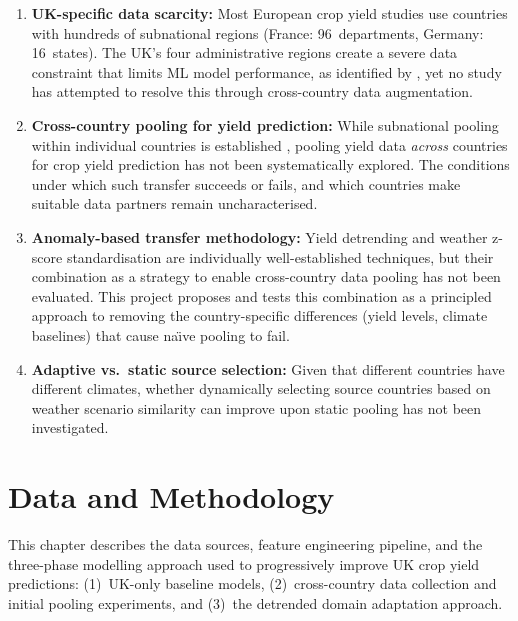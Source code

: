 \documentclass[12pt,a4paper]{report}
\begin{document}
\begin{enumerate}                                                                                                                                                  
      \item \textbf{UK-specific data scarcity:} Most European crop yield studies use countries with hundreds of subnational regions (France: 96~departments, Germany:
   16~states). The UK's four administrative regions create a severe data constraint that limits ML model performance, as identified by \citet{corcoran2023}, yet no  
  study has attempted to resolve this through cross-country data augmentation.                                                                                       
      \item \textbf{Cross-country pooling for yield prediction:} While subnational pooling within individual countries is established \citep{paudel2021}, pooling    
  yield data \emph{across} countries for crop yield prediction has not been systematically explored. The conditions under which such transfer succeeds or fails, and
   which countries make suitable data partners remain uncharacterised.
      \item \textbf{Anomaly-based transfer methodology:} Yield detrending and weather z-score standardisation are individually well-established techniques, but their
   combination as a strategy to enable cross-country data pooling has not been evaluated. This project proposes and tests this combination as a principled approach  
  to removing the country-specific differences (yield levels, climate baselines) that cause na\"{\i}ve pooling to fail.
      \item \textbf{Adaptive vs.\ static source selection:} Given that different countries have different climates, whether dynamically selecting source countries   
  based on weather scenario similarity can improve upon static pooling has not been investigated.                                                                    
  \end{enumerate}


\chapter{Data and Methodology}

This chapter describes the data sources, feature engineering pipeline, and the three-phase modelling approach used to progressively improve UK crop yield predictions: (1)~UK-only baseline models, (2)~cross-country data collection and initial pooling experiments, and (3)~the detrended domain adaptation approach.
\end{document}
